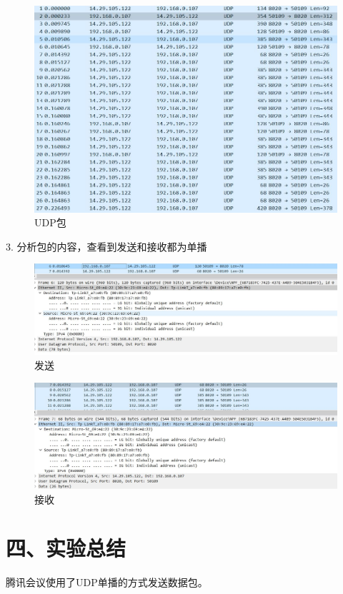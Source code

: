 \documentclass[UTF8]{ctexart}
\begin{document}
\begin{figure}[H]
\includegraphics[width=\textwidth]{pic/tx1.jpg}
\caption{UDP包}
\end{figure}

3. 分析包的内容，查看到发送和接收都为单播

\begin{figure}[H]
\includegraphics[width=\textwidth]{pic/txsend.jpg}
\caption{发送}
\end{figure}

\begin{figure}[H]
\includegraphics[width=\textwidth]{pic/txrecv.jpg}
\caption{接收}
\end{figure}



\section*{四、实验总结}

腾讯会议使用了UDP单播的方式发送数据包。
\end{document}

